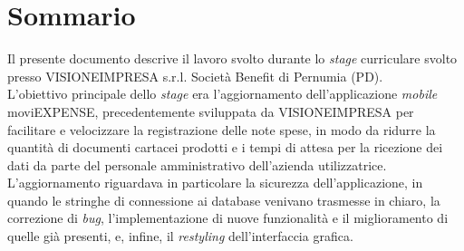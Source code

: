 \cleardoublepage
{}
{}
\begingroup
\let\clearpage\relax
\let\cleardoublepage\relax
\let\cleardoublepage\relax

\chapter*{Sommario}

Il presente documento descrive il lavoro svolto durante lo \textit{stage} curriculare svolto presso VISIONEIMPRESA s.r.l. Società Benefit di Pernumia (PD).\\
L'obiettivo principale dello \textit{stage} era l'aggiornamento dell'applicazione \textit{mobile} moviEXPENSE, precedentemente sviluppata da VISIONEIMPRESA per facilitare e velocizzare la registrazione delle note spese, in modo da ridurre la quantità di documenti cartacei prodotti e i tempi di attesa per la ricezione dei dati da parte del personale amministrativo dell'azienda utilizzatrice.\\
L'aggiornamento riguardava in particolare la sicurezza dell'applicazione, in quando le stringhe di connessione ai database venivano trasmesse in chiaro, la correzione di \textit{bug}, l'implementazione di nuove funzionalità e il miglioramento di quelle già presenti, e, infine, il \textit{restyling} dell'interfaccia grafica.

\endgroup

\vfill
